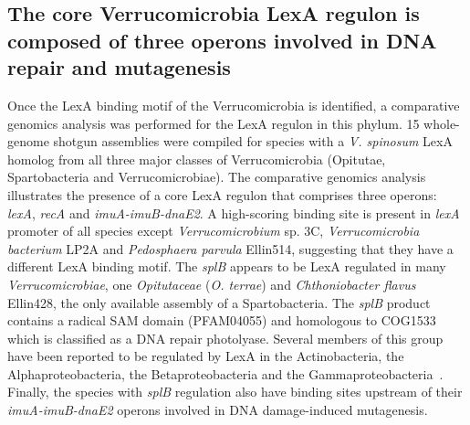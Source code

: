\subsection{The core Verrucomicrobia LexA regulon is composed of three operons
  involved in DNA repair and mutagenesis}

Once the LexA binding motif of the Verrucomicrobia is identified, a comparative
genomics analysis was performed for the LexA regulon in this phylum. 15
whole-genome shotgun assemblies were compiled for species with a
\textit{V. spinosum} LexA homolog from all three major classes of
Verrucomicrobia (Opitutae, Spartobacteria and Verrucomicrobiae). The
comparative genomics analysis illustrates the presence of a core LexA regulon
that comprises three operons: \textit{lexA}, \textit{recA} and
\textit{imuA-imuB-dnaE2}. A high-scoring binding site is present in
\textit{lexA} promoter of all species except \textit{Verrucomicrobium} sp. 3C,
\textit{Verrucomicrobia bacterium} LP2A and \textit{Pedosphaera parvula}
Ellin514, suggesting that they have a different LexA binding motif. The
\textit{splB} appears to be LexA regulated in many \textit{Verrucomicrobiae},
one \textit{Opitutaceae} (\textit{O. terrae}) and \textit{Chthoniobacter
  flavus} Ellin428, the only available assembly of a Spartobacteria. The
\textit{splB} product contains a radical SAM domain (PFAM04055) and homologous
to COG1533 which is classified as a DNA repair photolyase. Several members of
this group have been reported to be regulated by LexA in the Actinobacteria,
the Alphaproteobacteria, the Betaproteobacteria and the
Gammaproteobacteria~\cite{davis2002definition, cirz2006defining,
  sanchez2012analysis, ulrich2013characterization, sanchez2015sos}. Finally,
the species with \textit{splB} regulation also have binding sites upstream of
their \textit{imuA-imuB-dnaE2} operons involved in DNA damage-induced
mutagenesis.

